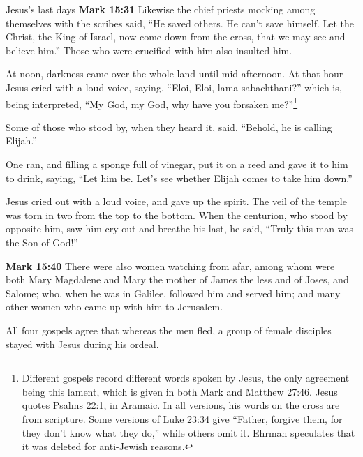 \documentclass[10pt,twoside]{article} %
\newcommand{\doimage}[2]{\texttt{[image: \#2]}\label{fig:#2}}
\newcommand{\figbasic}[4]{ %
    \ifthenelse{\isodd{\pageref{fig:#2}}}{}{\hfill}
    \ifstrempty{#3}{
      \doimage{#1}{#2}
    }{
      \makebox{\doimage{#1}{#2} \\ #3}
    }
    \ifthenelse{\isodd{\pageref{fig:#2}}}{\hfill}{}
    \par
}
\newcommand{\fig}[2][0.4]{
  \figbasic{#1}{#2}{}{}
}
\newcommand{\quotesize}{\normalsize{}}
\newcommand{\comm}[1]{\begingroup \color{black!50} #1\endgroup}
\newenvironment{quotetext}{\begingroup\quotesize}{\endgroup}
\newcommand{\intex}[1]{\index[texts]{#1}}
\newcommand{\reftex}[1]{#1\intex{#1}}
\newcommand{\bible}[2]{\begin{quotetext}\textbf{#1}\intex{#1} #2\end{quotetext}}
\newcommand{\gospelmark}[2]{\bible{Mark #1}{#2}}
\begin{document}
\begin{section}{Jesus's last days}
\gospelmark{15:31}{
  Likewise the chief priests mocking among themselves with the scribes said, ``He saved others. He can't save himself.   Let the Christ, the King of Israel, now come down from the cross, that we may see and believe him.'' Those who were crucified with him also insulted him.

  At noon, darkness came over the whole land until mid-afternoon.   At that hour Jesus cried with a loud voice, saying, ``Eloi, Eloi, lama sabachthani?'' which is, being interpreted, ``My God, my God, why have
you forsaken me?''\footnote{Different gospels record different words spoken by Jesus, the only agreement being this lament, which is
given in both Mark and Matthew 27:46. Jesus quotes Psalms 22:1, in Aramaic. In all versions, his words on the cross are from scripture.
Some versions of \reftex{Luke 23:34} give ``Father, forgive them, for they don’t know what they do,'' while others omit it. Ehrman
speculates that it was deleted for anti-Jewish reasons.}


  Some of those who stood by, when they heard it, said, ``Behold, he is calling Elijah.''

  One ran, and filling a sponge full of vinegar, put it on a reed and gave it to him to drink, saying, ``Let him be. Let's see whether Elijah comes to take him down.''

  Jesus cried out with a loud voice, and gave up the spirit.   The veil of the temple was torn in two from the top to the bottom.   
When the centurion, who stood by opposite him, saw him cry out and breathe his last, he said, ``Truly this man was the Son of God!''}

\fig[0.6]{what-our-lord-saw-from-the-cross-detail}

\gospelmark{15:40}{
  There were also women watching from afar, among whom were both Mary Magdalene and Mary the mother of James the less and of Joses, and Salome;   who, when he was in Galilee, followed him and served him; and many other women who came up with him to Jerusalem.
}

\comm{All four gospels agree that whereas the men fled, a group of female disciples stayed with Jesus during his ordeal.}

\end{section}

\fig{resurrection-mary-magdalene}
\end{document}
